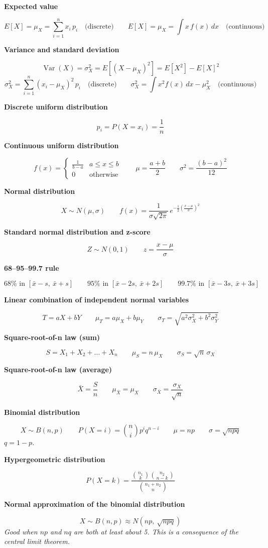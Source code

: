 \documentclass[11pt]{article}
\newcommand{\sub}[1]{\par\medskip\textbf{#1}\par}
\newcommand{\expl}[1]{{\color{gray}\itshape #1}\par}
\begin{document}
\sub{Expected value}
\[ E[X] = \mu_X = \sum_{i=1}^{n} x_i\,p_i \quad\text{(discrete)} \qquad E[X] = \mu_X = \int x\,f(x)\,dx \quad\text{(continuous)} \]

\sub{Variance and standard deviation}
\[ \operatorname{Var}(X) = \sigma_X^2 = E\left[(X - \mu_X)^2\right] = E[X^2] - E[X]^2 \]
\[ \sigma_X^2 = \sum_{i=1}^{n} (x_i - \mu_X)^2\,p_i \quad\text{(discrete)} \qquad \sigma_X^2 = \int x^2 f(x)\,dx - \mu_X^2 \quad\text{(continuous)} \]

\sub{Discrete uniform distribution}
\[ p_i = P(X = x_i) = \frac{1}{n} \]

\sub{Continuous uniform distribution}
\[ f(x) = \begin{cases} \frac{1}{b - a} & a \le x \le b \\ 0 & \text{otherwise} \end{cases} \qquad \mu = \frac{a + b}{2} \qquad \sigma^2 = \frac{(b - a)^2}{12} \]

\sub{Normal distribution}
\[ X \sim N(\mu, \sigma) \qquad f(x) = \frac{1}{\sigma\sqrt{2\pi}}\,e^{-\frac{1}{2}\left(\frac{x - \mu}{\sigma}\right)^2} \]

\sub{Standard normal distribution and z-score}
\[ Z \sim N(0, 1) \qquad z = \frac{x - \mu}{\sigma} \]

\sub{68–95–99.7 rule}
\[ 68\% \text{ in } [\bar x - s,\ \bar x + s] \qquad 95\% \text{ in } [\bar x - 2s,\ \bar x + 2s] \qquad 99.7\% \text{ in } [\bar x - 3s,\ \bar x + 3s] \]

\sub{Linear combination of independent normal variables}
\[ T = aX + bY \qquad \mu_T = a\mu_X + b\mu_Y \qquad \sigma_T = \sqrt{a^2\sigma_X^2 + b^2\sigma_Y^2} \]

\sub{Square-root-of-n law (sum)}
\[ S = X_1 + X_2 + \dots + X_n \qquad \mu_S = n\,\mu_X \qquad \sigma_S = \sqrt{n}\,\sigma_X \]

\sub{Square-root-of-n law (average)}
\[ \bar X = \frac{S}{n} \qquad \mu_{\bar X} = \mu_X \qquad \sigma_{\bar X} = \frac{\sigma_X}{\sqrt n} \]

\sub{Binomial distribution}
\[ X \sim B(n, p) \qquad P(X = i) = \binom{n}{i} p^i q^{n-i} \qquad \mu = np \qquad \sigma = \sqrt{npq} \]
\expl{$q = 1 - p$.}

\sub{Hypergeometric distribution}
\[ P(X = k) = \frac{\binom{n_1}{k}\binom{n_2}{n - k}}{\binom{n_1 + n_2}{n}} \]

\sub{Normal approximation of the binomial distribution}
\[ X \sim B(n, p) \approx N\!\left(np,\ \sqrt{npq}\right) \]
\expl{Good when $np$ and $nq$ are both at least about 5. This is a consequence of the central limit theorem.}
\end{document}
